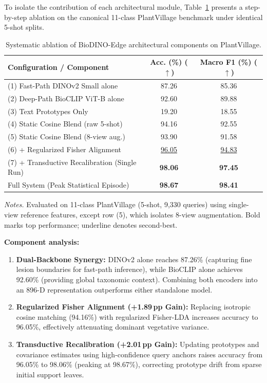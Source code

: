To isolate the contribution of each architectural module, Table~\ref{tab:ablation} presents a step-by-step ablation on the canonical 11-class PlantVillage benchmark under identical 5-shot splits.

\begin{table}[htbp]
\caption{Systematic ablation of BioDINO-Edge architectural components on PlantVillage.}
\label{tab:ablation}
\centering

\footnotesize
\setlength{\tabcolsep}{3pt}
\begin{tabular*}{\columnwidth}{@{\extracolsep{\fill}}lcc}
\toprule
\textbf{Configuration / Component} & \textbf{Acc. (\%) ($\uparrow$)} & \textbf{Macro F1 (\%) ($\uparrow$)} \\
\midrule
(1) Fast-Path DINOv2 Small alone & 87.26 & 85.36 \\
(2) Deep-Path BioCLIP ViT-B alone & 92.60 & 89.88 \\
(3) Text Prototypes Only & 19.20 & 18.55 \\
(4) Static Cosine Blend (raw 5-shot) & 94.16 & 92.55 \\
(5) Static Cosine Blend (8-view aug.) & 93.90 & 91.58 \\
(6) + Regularized Fisher Alignment & \underline{96.05} & \underline{94.83} \\
(7) + Transductive Recalibration (Single Run) & \textbf{98.06} & \textbf{97.45} \\
\midrule
Full System (Peak Statistical Episode) & \textbf{98.67} & \textbf{98.41} \\
\bottomrule
\end{tabular*}

\vspace{3pt}
\begin{minipage}{\columnwidth}
\footnotesize
\textit{Notes.} Evaluated on 11-class PlantVillage (5-shot, 9,330 queries) using single-view reference features, except row (5), which isolates 8-view augmentation. Bold marks top performance; underline denotes second-best.
\end{minipage}
\end{table}

\textbf{Component analysis:}
\begin{enumerate}
    \item \textbf{Dual-Backbone Synergy:} DINOv2 alone reaches 87.26\% (capturing fine lesion boundaries for fast-path inference), while BioCLIP alone achieves 92.60\% (providing global taxonomic context). Combining both encoders into an 896-D representation outperforms either standalone model.
    \item \textbf{Regularized Fisher Alignment (+1.89\,pp Gain):} Replacing isotropic cosine matching (94.16\%) with regularized Fisher-LDA increases accuracy to 96.05\%, effectively attenuating dominant vegetative variance.
    \item \textbf{Transductive Recalibration (+2.01\,pp Gain):} Updating prototypes and covariance estimates using high-confidence query anchors raises accuracy from 96.05\% to 98.06\% (peaking at 98.67\%), correcting prototype drift from sparse initial support leaves.
\end{enumerate}

